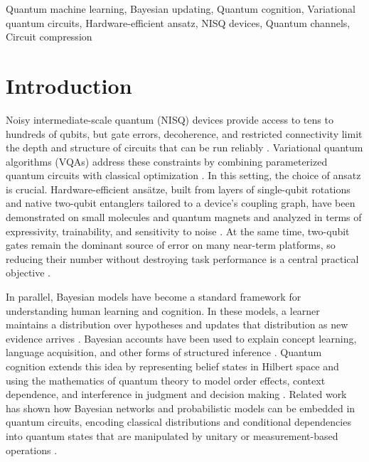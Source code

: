 \documentclass[conference]{IEEEtran}
\begin{document}
\begin{IEEEkeywords}
Quantum machine learning, Bayesian updating, Quantum cognition, Variational quantum circuits, Hardware-efficient ansatz, NISQ devices, Quantum channels, Circuit compression
\end{IEEEkeywords}

\section{Introduction}

Noisy intermediate-scale quantum (NISQ) devices provide access to tens to hundreds of qubits, but gate errors, decoherence, and restricted connectivity limit the depth and structure of circuits that can be run reliably \cite{b7}. Variational quantum algorithms (VQAs) address these constraints by combining parameterized quantum circuits with classical optimization \cite{b4,b6}. In this setting, the choice of ansatz is crucial. Hardware-efficient ansätze, built from layers of single-qubit rotations and native two-qubit entanglers tailored to a device’s coupling graph, have been demonstrated on small molecules and quantum magnets \cite{b4} and analyzed in terms of expressivity, trainability, and sensitivity to noise \cite{b5}. At the same time, two-qubit gates remain the dominant source of error on many near-term platforms, so reducing their number without destroying task performance is a central practical objective \cite{b7,b10}.

In parallel, Bayesian models have become a standard framework for understanding human learning and cognition. In these models, a learner maintains a distribution over hypotheses and updates that distribution as new evidence arrives \cite{b1,b2,b11}. Bayesian accounts have been used to explain concept learning, language acquisition, and other forms of structured inference \cite{b1,b11}. Quantum cognition extends this idea by representing belief states in Hilbert space and using the mathematics of quantum theory to model order effects, context dependence, and interference in judgment and decision making \cite{b3}. Related work has shown how Bayesian networks and probabilistic models can be embedded in quantum circuits, encoding classical distributions and conditional dependencies into quantum states that are manipulated by unitary or measurement-based operations \cite{b8,b9}.
\end{document}
